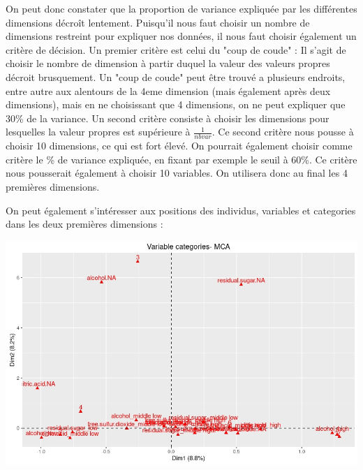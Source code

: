 \documentclass[11pt,a4paper]{article}
\begin{document}
On peut donc constater que la proportion de variance expliquée par les différentes dimensions décroît lentement. Puisqu'il nous faut choisir un nombre de dimensions restreint pour expliquer nos données, il nous faut choisir également un critère de décision. Un premier critère est celui du "coup de coude" : Il s'agit de choisir le nombre de dimension à partir duquel la valeur des valeurs propres décroit brusquement. Un "coup de coude" peut être trouvé a plusieurs endroits, entre autre aux alentours de la 4eme dimension (mais également après deux dimensions), mais en ne choisissant que 4 dimensions, on ne peut expliquer que 30\% de la variance. Un second critère consiste à choisir les dimensions pour lesquelles la valeur propres est supérieure à $\frac{1}{nbvar}$. Ce second critère nous pousse à choisir 10 dimensions, ce qui est fort élevé. On pourrait également choisir comme critère le \% de variance expliquée, en fixant par exemple le seuil à 60\%. Ce critère nous pousserait également à choisir 10 variables. On utilisera  donc au final les 4 premières dimensions.\bigskip

On peut également s'intéresser aux positions des individus, variables et categories dans les deux premières dimensions :

\begin{center}
\includegraphics[scale=0.6]{"biplot-mca"}
\end{center}
\end{document}
